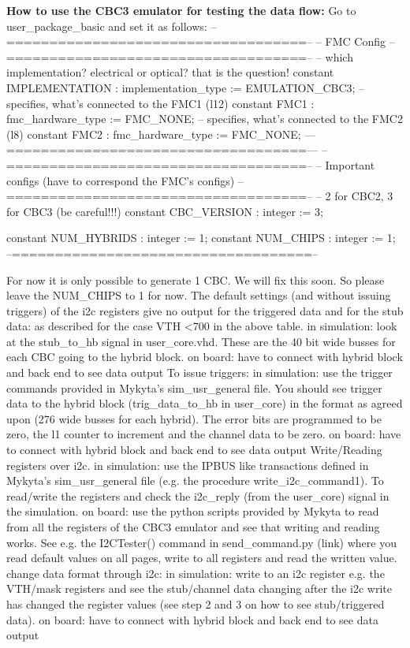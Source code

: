 \textbf{How to use the CBC3 emulator for testing the data flow:}
Go to user_package_basic and set it as follows:
--===================================--
    -- FMC Config
    --===================================--
    -- which implementation? electrical or optical? that is the question!
    constant IMPLEMENTATION         : implementation_type := EMULATION_CBC3;
    -- specifies, what's connected to the FMC1 (l12)
    constant FMC1                   : fmc_hardware_type := FMC_NONE;
    -- specifies, what's connected to the FMC2 (l8)
    constant FMC2                   : fmc_hardware_type := FMC_NONE;
    —===================================—
 --===================================--
    -- Important configs (have to correspond the FMC's configs)
    --===================================--
    -- 2 for CBC2, 3 for CBC3 (be careful!!!)
    constant CBC_VERSION            : integer := 3;     

    constant NUM_HYBRIDS            : integer := 1;
    constant NUM_CHIPS              : integer := 1;    
    --===================================--

For now it is only possible to generate 1 CBC.  We will fix this soon. So please leave the NUM_CHIPS to 1 for now.
The default settings (and without issuing triggers) of the i2c registers give no output for the triggered data and for the stub data: as described for the case VTH <700 in the above table.
in simulation: look at the stub_to_hb signal in user_core.vhd. These are the 40 bit wide busses for each CBC going to the hybrid block.
on board: have to connect with hybrid block and back end to see data output
To issue triggers:
in simulation: use the trigger commands provided in Mykyta’s sim_usr_general file. You should see trigger data to the hybrid block (trig_data_to_hb in user_core) in the format as agreed upon (276 wide busses for each hybrid). The error bits are programmed to be zero, the l1 counter to increment and the channel data to be zero.
on board: have to connect with hybrid block and back end to see data output
Write/Reading registers over i2c. 
in simulation: use the IPBUS like transactions defined in Mykyta’s sim_usr_general file (e.g. the procedure write_i2c_command1). To read/write the registers and check the i2c_reply (from the user_core) signal in the simulation.
on board: use the python scripts provided by Mykyta to read from all the registers of the CBC3 emulator and see that writing and reading works. See e.g. the I2CTester() command in send_command.py (link) where you read default values on all pages, write to all registers and read the written value.
change data format through i2c:
in simulation: write to an i2c register e.g. the VTH/mask registers and see the stub/channel data changing after the i2c write has changed the register values (see step 2 and 3 on how to see stub/triggered data).
on board: have to connect with hybrid block and back end to see data output